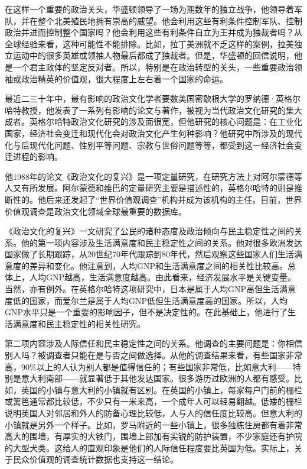 在这样一个重要的政治关头，华盛顿领导了一场为期数年的独立战争，他领导着军队，并在整个北美殖民地拥有崇高的威望。他会利用这些有利条件控制军队、控制政治并进而控制整个国家吗？他会利用这些有利条件自立为王并成为独裁者吗？从全球经验来看，这种可能性不能排除。比如，拉丁美洲就不乏这样的案例，拉美独立运动中的很多英雄或领袖人物最后都成了独裁者。但是，华盛顿的回信说明，他是一个君主政体的坚定反对者。所以，特别是在政治转型的关头，一些重要政治领袖或政治精英的价值观，很大程度上左右着一个国家的命运。


最近二三十年中，最有影响的政治文化学者要数美国密歇根大学的罗纳德·英格尔哈特教授，他发表了一系列有影响的论文与著作，被视为当代政治文化研究的集大成者。英格尔哈特政治文化研究的涉及面很宽，但他研究的核心问题是：在工业化国家，经济社会变迁和现代化会对政治文化产生何种影响？他研究中所涉及的现代化与后现代化问题、性别平等问题、宗教与世俗问题等等，都受到这一经济社会变迁进程的影响。

他1988年的论文《政治文化的复兴》是一项定量研究，在研究方法上对阿尔蒙德等人又有所发展。阿尔蒙德和维巴的定量研究主要是描述性的，英格尔哈特的则是推断性的。他后来还发起了“世界价值观调查”机构并成为该机构的主任。目前，世界价值观调查是政治文化领域全球最重要的数据库。

《政治文化的复兴》一文研究了公民的诸种态度及政治倾向与民主稳定性之间的关系。他的第一项内容涉及生活满意度和民主稳定性之间的关系。他对很多欧洲发达国家做了长期跟踪，从20世纪70年代跟踪到80年代，然后观察这些国家人们生活满意度的差异和变化。他注意到，人均GNP和生活满意度之间的相关性比较高。总体上，人均GNP越高，生活满意度越高。由此看来，经济发展水平是关键变量。当然，亦有例外。在英格尔哈特这项研究中，日本是属于人均GNP高但生活满意度低的国家，而爱尔兰是属于人均GNP低但生活满意度高的国家。所以，人均GNP水平只是一个重要的影响因子，但不是决定性的。在此基础上，他进行了生活满意度和民主稳定性的相关性研究。

第二项内容涉及人际信任和民主稳定性之间的关系。他调查的主要问题是：你相信别人吗？被调查者只能在是与否之间做选择。从他的调查结果来看，有些国家非常高，90\%以上的人认为别人都是值得信任的；有些国家非常低，比如意大利——特别是意大利南部——就显著低于其他发达国家。很多游历过欧洲的人都有感受。比如，英国的小镇与意大利的小镇就有区别。在英国的小镇上，每家每户门前的栅栏或篱笆通常都比较低，不少只有一米来高，一个成年人可以轻易翻越。低矮的栅栏说明英国人对邻居和外人的防备心理比较低，人与人的信任度比较高。但意大利的小镇就是另外一个样子。比如，罗马附近的一些小镇上，很多独栋住房都有着非常高大的围墙，有厚实的大铁门，围墙上部加有尖锐的防护装置，不少家庭还有护院的大型犬类。这给人的直观印象是他们的人际信任程度要比英国为低。实际上，关于民众价值观的调查统计数据也支持这一结论。


